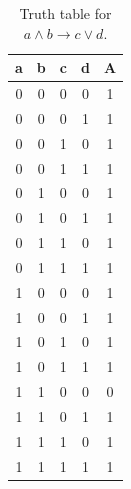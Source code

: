 \begin{table}[!tb]
    \centering
    \begin{tabular}{|c|c|c|c|c|}
        \hline
        \textbf{a} & \textbf{b} & \textbf{c} & \textbf{d} & \textbf{A} \\ \hline
        0 & 0 & 0 & 0 & 1 \\ \hline
        0 & 0 & 0 & 1 & 1 \\ \hline
        0 & 0 & 1 & 0 & 1 \\ \hline
        0 & 0 & 1 & 1 & 1 \\ \hline
        0 & 1 & 0 & 0 & 1 \\ \hline
        0 & 1 & 0 & 1 & 1 \\ \hline
        0 & 1 & 1 & 0 & 1 \\ \hline
        0 & 1 & 1 & 1 & 1 \\ \hline
        1 & 0 & 0 & 0 & 1 \\ \hline
        1 & 0 & 0 & 1 & 1 \\ \hline
        1 & 0 & 1 & 0 & 1 \\ \hline
        1 & 0 & 1 & 1 & 1 \\ \hline
        1 & 1 & 0 & 0 & 0 \\ \hline
        1 & 1 & 0 & 1 & 1 \\ \hline
        1 & 1 & 1 & 0 & 1 \\ \hline
        1 & 1 & 1 & 1 & 1 \\ \hline
    \end{tabular}
    \caption{Truth table for $a \land b \rightarrow c \lor d$.}
    \label{tab:truthtab}
\end{table}

